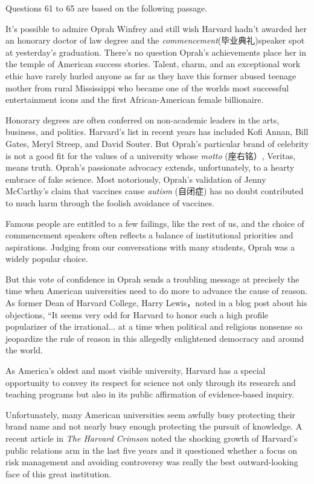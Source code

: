 \documentclass[UTF8,11pt]{ctexart}
\begin{document}
Questions 61 to 65 are based on the following passage.


It’s possible to admire Oprah Winfrey and still wish Harvard hadn’t awarded her an honorary doctor of law degree and the \textit{commencement}(毕业典礼)speaker spot at yesterday’s graduation. There’s no question Oprah’s achievements place her in the temple of American success stories. Talent, charm, and an exceptional work ethic have rarely hurled anyone as far as they have this former abused teenage mother from rural Mississippi who became one of the worlds most successful entertainment icons and the first African-American female billionaire.


Honorary degrees are often conferred on non-academic leaders in the arts, business, and politics. Harvard’s list in recent years has included Kofi Annan, Bill Gates, Meryl Streep, and David Souter. But Oprah’s particular brand of celebrity is not a good fit for the values of a university whose\textit{ motto} (座右铭）, Veritas, means truth. Oprah’s passionate advocacy extends, unfortunately, to a hearty embrace of fake science. Most notoriously, Oprah’s validation of Jenny McCarthy’s claim that vaccines cause\textit{ autism} (自闭症) has no doubt contributed to much harm through the foolish avoidance of vaccines.


Famous people are entitled to a few failings, like the rest of us, and the choice of commencement speakers often reflects a balance of institutional priorities and aspirations. Judging from our conversations with many students, Oprah was a widely popular choice.


But this vote of confidence in Oprah sends a troubling message at precisely the time when American universities need to do more to advance the cause of reason. As former Dean of Harvard College, Harry Lewis，noted in a blog post about his objections, “It seems very odd for Harvard to honor such a high profile popularizer of the irrational... at a time when political and religious nonsense so jeopardize the rule of reason in this allegedly enlightened democracy and around the world.


As America’s oldest and most visible university, Harvard has a special opportunity to convey its respect for science not only through its research and teaching programs but also in its public affirmation of evidence-based inquiry.


Unfortunately, many American universities seem awfully busy protecting their brand name and not nearly busy enough protecting the pursuit of knowledge. A recent article in\textit{ The Harvard Crimson} noted the shocking growth of Harvard’s public relations arm in the last five years and it questioned whether a focus on risk management and avoiding controversy was really the best outward-looking face of this great institution.
\end{document}
